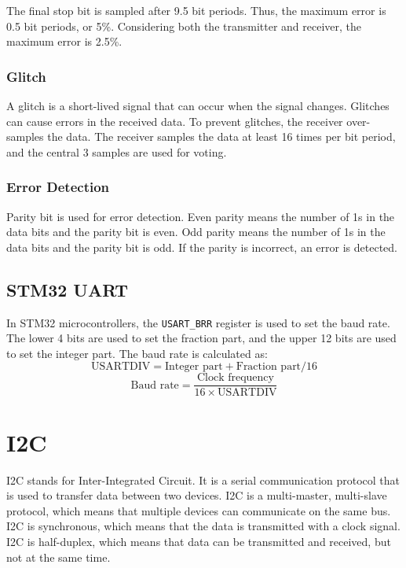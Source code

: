 \documentclass[a4paper,12pt]{article}
\begin{document}
The final stop bit is sampled after 9.5 bit periods. Thus, the maximum error is 0.5 bit periods, or 5\%. Considering both the transmitter and receiver, the maximum error is 2.5\%.

\subsubsection{Glitch}

A glitch is a short-lived signal that can occur when the signal changes. Glitches can cause errors in the received data. To prevent glitches, the receiver over-samples the data. The receiver samples the data at least 16 times per bit period, and the central 3 samples are used for voting.

\subsubsection{Error Detection}

Parity bit is used for error detection. Even parity means the number of 1s in the data bits and the parity bit is even. Odd parity means the number of 1s in the data bits and the parity bit is odd. If the parity is incorrect, an error is detected.

\subsection{STM32 UART}

In STM32 microcontrollers, the \texttt{USART\_BRR} register is used to set the baud rate. The lower 4 bits are used to set the fraction part, and the upper 12 bits are used to set the integer part. The baud rate is calculated as:
\begin{equation*}
	\text{USARTDIV} = \text{Integer part} + \text{Fraction part} / 16
\end{equation*}
\begin{equation*}
	\text{Baud rate} = \frac{\text{Clock frequency}}{16 \times \text{USARTDIV}}
\end{equation*}

\section{I2C}

I2C stands for Inter-Integrated Circuit. It is a serial communication protocol that is used to transfer data between two devices. I2C is a multi-master, multi-slave protocol, which means that multiple devices can communicate on the same bus. I2C is synchronous, which means that the data is transmitted with a clock signal. I2C is half-duplex, which means that data can be transmitted and received, but not at the same time.
\end{document}
